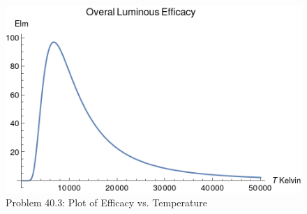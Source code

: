 \documentclass[a4paper,twoside]{article}
\begin{document}
\begin{figure}[h]
    \centering
    \includegraphics[width=\textwidth]{40_3.png}
    \caption{Problem 40.3: Plot of Efficacy vs. Temperature}
    \label{fig:40_3}
\end{figure}
\end{document}
